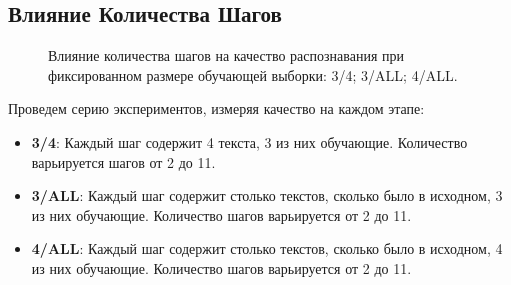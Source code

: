 \documentclass[12pt]{article}
\begin{document}
\subsection{Влияние Количества Шагов}

\begin{figure}[h!]  
\vspace{-2ex} \centering {}  
\hspace{2ex}
\hspace{2ex}
\caption{Влияние количества шагов на качество распознавания при фиксированном размере обучающей выборки:  3/4;  3/ALL;  4/ALL.} \label{fig:steps}
\end{figure}

Проведем серию экспериментов, измеряя качество на каждом этапе:

\begin{itemize}
	\item \textbf{3/4}: Каждый шаг содержит 4 текста, 3 из них обучающие. Количество варьируется шагов от 2 до 11. 
	\item \textbf{3/ALL}: Каждый шаг содержит столько текстов, сколько было в исходном, 3 из них обучающие. Количество шагов варьируется от 2 до 11. 
	\item \textbf{4/ALL}: Каждый шаг содержит столько текстов, сколько было в исходном, 4 из них обучающие. Количество шагов варьируется от 2 до 11. 
\end{itemize}
\end{document}
